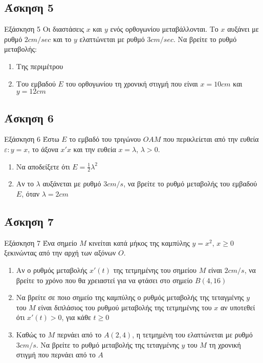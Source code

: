 \documentclass[greek]{beamer}
\begin{document}
\subsection{Άσκηση 5}
\begin{frame}[label=Άσκηση5]{Εξάσκηση 5}
 Οι διαστάσεις $x$ και $y$ ενός ορθογωνίου μεταβάλλονται. Το $x$ αυξάνει με ρυθμό $2cm/sec$ και το $y$ ελαττώνεται με ρυθμό $3cm/sec$. Να βρείτε το ρυθμό μεταβολής:
 \begin{enumerate}
  \item<1-> Της περιμέτρου
  \item<2-> Του εμβαδού $Ε$ του ορθογωνίου τη χρονική στιγμή που είναι $x=10cm$ και $y=12cm$
 \end{enumerate}

\end{frame}

\subsection{Άσκηση 6}
\begin{frame}[label=Άσκηση6]{Εξάσκηση 6}
 Έστω $Ε$ το εμβαδό του τριγώνου $ΟΑΜ$ που περικλείεται από την ευθεία $ε:y=x$, το άξονα $x'x$ και την ευθεία $x=λ$, $λ>0$.
 \begin{enumerate}
  \item<1-> Να αποδείξετε ότι $Ε=\frac{1}{2}λ^2$
  \item<2-> Αν το $λ$ αυξάνεται με ρυθμό $3cm/s$, να βρείτε το ρυθμό μεταβολής του εμβαδού $Ε$, όταν $λ=2cm$
 \end{enumerate}

\end{frame}

\subsection{Άσκηση 7}
\begin{frame}[label=Άσκηση7]{Εξάσκηση 7}
 Ένα σημείο $Μ$ κινείται κατά μήκος της καμπύλης $y=x^2$, $x\ge0$ ξεκινώντας από την αρχή των αξόνων $Ο$.
 \begin{enumerate}
  \item<1-> Αν ο ρυθμός μεταβολής $x'(t)$ της τετμημένης του σημείου $Μ$ είναι $2cm/s$, να βρείτε το χρόνο που θα χρειαστεί για να φτάσει στο σημείο $Β(4,16)$
  \item<2-> Να βρείτε σε ποιο σημείο της καμπύλης ο ρυθμός μεταβολής της τεταγμένης $y$ του $Μ$ είναι διπλάσιος του ρυθμού μεταβολής της τετμημένης του $x$ αν υποτεθεί ότι $x'(t)>0$, για κάθε $t\ge0$
  \item<3-> Καθώς το $Μ$ περνάει από το $Α(2,4)$, η τετμημένη του ελαττώνεται με ρυθμό $3cm/s$. Να βρείτε το ρυθμό μεταβολής της τεταγμένης $y$ του $Μ$ τη χρονική στιγμή που περνάει από το $Α$
 \end{enumerate}

\end{frame}
\end{document}
